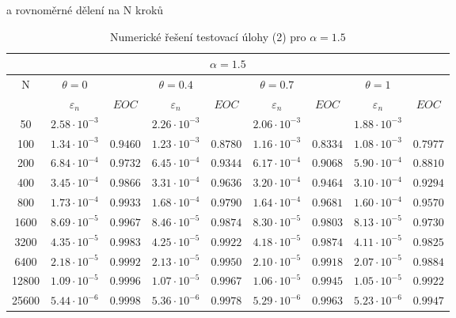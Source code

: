 \documentclass[a4paper,12pt,twoside]{article}
\theoremstyle{definition}
\theoremstyle{remark}
\numberwithin{equation}{section}
\numberwithin{table}{section}
\numberwithin{figure}{section}
\begin{document}
	\begin{table}[h!]
		\centering
		\caption{Numerické řešení testovací úlohy (2) pro $\alpha = 1.5$} a rovnoměrné dělení na N kroků
		\label{tab:tabulkaTestovacíÚloha(2),alpha=1.5}
	\begin{tabular}{|c||cc|cc|cc|cc|}
		\hline
		\multicolumn{9}{|c|}{$\alpha = 1.5$} \\
		\hline
		 N 	  & $\theta = 0$ & & $\theta = 0.4$ && $\theta = 0.7$ & &$\theta = 1$& \\
		\hline
		      & $\varepsilon_{n}$    & $EOC$    & $\varepsilon_{n}$    &$EOC$   & $\varepsilon_{n}$    &$EOC$    &$\varepsilon_{n}$    &$EOC$ \\
		50 	  & $2.58 \cdot 10^{-3}$ & 		    & $2.26 \cdot 10^{-3}$ &		& $2.06 \cdot 10^{-3}$ & 	     &$1.88 \cdot 10^{-3}$& \\
		\hline
		100   & $1.34 \cdot 10^{-3}$ & $0.9460$ & $1.23 \cdot 10^{-3}$ &$0.8780$& $1.16 \cdot 10^{-3}$ &$0.8334$ &$1.08 \cdot 10^{-3}$&$0.7977$ \\
		\hline
		200   & $6.84 \cdot 10^{-4}$ & $0.9732$ & $6.45 \cdot 10^{-4}$ &$0.9344$& $6.17 \cdot 10^{-4}$ &$0.9068$ &$5.90 \cdot 10^{-4}$&$0.8810$\\
		\hline
		400   & $3.45 \cdot 10^{-4}$ & $0.9866$ & $3.31 \cdot 10^{-4}$ &$0.9636$& $3.20 \cdot 10^{-4}$ &$0.9464$ &$3.10 \cdot 10^{-4}$&$0.9294$ \\
		\hline
		800   & $1.73 \cdot 10^{-4}$ & $0.9933$ & $1.68 \cdot 10^{-4}$ &$0.9790$& $1.64 \cdot 10^{-4}$ &$0.9681$ &$1.60 \cdot 10^{-4}$&$0.9570$ \\
		\hline
		1600  & $8.69 \cdot 10^{-5}$ & $0.9967$ & $8.46 \cdot 10^{-5}$ &$0.9874$& $8.30 \cdot 10^{-5}$ &$0.9803$ &$8.13 \cdot 10^{-5}$&$0.9730$ \\
		\hline
		3200  & $4.35 \cdot 10^{-5}$ & $0.9983$ & $4.25 \cdot 10^{-5}$ &$0.9922$& $4.18 \cdot 10^{-5}$ &$0.9874$ &$4.11 \cdot 10^{-5}$&$0.9825$ \\
		\hline
		6400  & $2.18 \cdot 10^{-5}$ & $0.9992$ & $2.13 \cdot 10^{-5}$ &$0.9950$& $2.10 \cdot 10^{-5}$ &$0.9918$ &$2.07 \cdot 10^{-5}$&$0.9884$ \\
		\hline
		12800 & $1.09 \cdot 10^{-5}$ & $0.9996$ & $1.07 \cdot 10^{-5}$ &$0.9967$& $1.06 \cdot 10^{-5}$ &$0.9945$ &$1.05 \cdot 10^{-5}$&$0.9922$ \\
		\hline
		25600 & $5.44 \cdot 10^{-6}$ & $0.9998$ & $5.36 \cdot 10^{-6}$ &$0.9978$& $5.29 \cdot 10^{-6}$ &$0.9963$ &$5.23 \cdot 10^{-6}$&$0.9947$ \\
		\hline
	\end{tabular}
\end{table}
\end{document}
